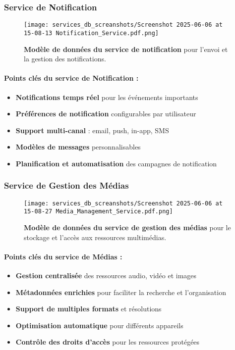 \subsubsection{Service de Notification}
\begin{figure}[h!]
  \centering
  \texttt{[image: services\_db\_screanshots/Screenshot 2025-06-06 at 15-08-13 Notification\_Service.pdf.png]}
  \caption{\textbf{Modèle de données du service de notification} pour l'envoi et la gestion des notifications.}
  \label{fig:notification_service}
\end{figure}
\vspace{-10pt}
\small
\paragraph{Points clés du service de Notification :}
\begin{itemize}[leftmargin=*,noitemsep,topsep=0pt]
  \item \textbf{Notifications temps réel} pour les événements importants
  \item \textbf{Préférences de notification} configurables par utilisateur
  \item \textbf{Support multi-canal} : email, push, in-app, SMS
  \item \textbf{Modèles de messages} personnalisables
  \item \textbf{Planification et automatisation} des campagnes de notification
\end{itemize}
\normalsize
\newpage

\subsubsection{Service de Gestion des Médias}
\begin{figure}[h!]
  \centering
  \texttt{[image: services\_db\_screanshots/Screenshot 2025-06-06 at 15-08-27 Media\_Management\_Service.pdf.png]}
  \caption{\textbf{Modèle de données du service de gestion des médias} pour le stockage et l'accès aux ressources multimédias.}
  \label{fig:media_service}
\end{figure}
\vspace{-10pt}
\small
\paragraph{Points clés du service de Médias :}
\begin{itemize}[leftmargin=*,noitemsep,topsep=0pt]
  \item \textbf{Gestion centralisée} des ressources audio, vidéo et images
  \item \textbf{Métadonnées enrichies} pour faciliter la recherche et l'organisation
  \item \textbf{Support de multiples formats} et résolutions
  \item \textbf{Optimisation automatique} pour différents appareils
  \item \textbf{Contrôle des droits d'accès} pour les ressources protégées
\end{itemize}
\normalsize
\newpage

